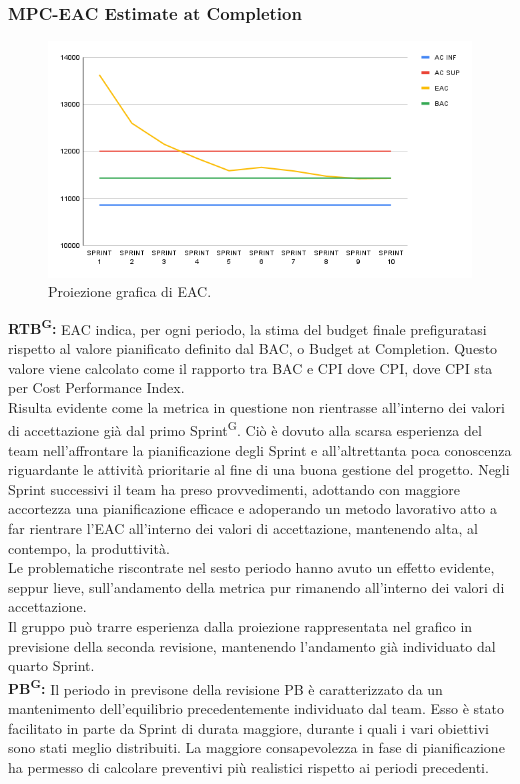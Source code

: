 \documentclass[8pt]{article}
\newcommand{\glossterm}[1]{#1\textsuperscript{G}} %
\begin{document}
\subsubsection{MPC-EAC Estimate at Completion}
\setlength\parindent{0em}
\begin{figure}[h!]
    \centering
    \includegraphics[width=1\textwidth]{images_pdq/EAC.png}
    \caption{Proiezione grafica di EAC.}
    \label{fig:Proiezione grafica di EAC}
\end{figure}
\textbf{\glossterm{RTB}:} EAC indica, per ogni periodo, la stima del budget finale prefiguratasi rispetto al valore pianificato definito dal BAC, o Budget at Completion. Questo valore viene calcolato come il rapporto tra BAC e CPI dove CPI, dove CPI sta per Cost Performance Index.\\
Risulta evidente come la metrica in questione non rientrasse all'interno dei valori di accettazione già dal primo \glossterm{Sprint}. Ciò è dovuto alla scarsa esperienza del team nell'affrontare la pianificazione degli Sprint e all'altrettanta poca conoscenza riguardante le attività prioritarie al fine di una buona gestione del progetto. Negli Sprint successivi il team ha preso provvedimenti, adottando con maggiore accortezza una pianificazione efficace e adoperando un metodo lavorativo atto a far rientrare l'EAC all'interno dei valori di accettazione, mantenendo alta, al contempo, la produttività.\\
Le problematiche riscontrate nel sesto periodo hanno avuto un effetto evidente, seppur lieve, sull'andamento della metrica pur rimanendo all'interno dei valori di accettazione.\\
Il gruppo può trarre esperienza dalla proiezione rappresentata nel grafico in previsione della seconda revisione, mantenendo l'andamento già individuato dal quarto Sprint.\\
\textbf{\glossterm{PB}:} Il periodo in previsone della revisione PB è caratterizzato da un mantenimento dell'equilibrio precedentemente individuato dal team. Esso è stato facilitato in parte da Sprint di durata maggiore, durante i quali i vari obiettivi sono stati meglio distribuiti. La maggiore consapevolezza in fase di pianificazione ha permesso di calcolare preventivi più realistici rispetto ai periodi precedenti.
\clearpage
\end{document}

